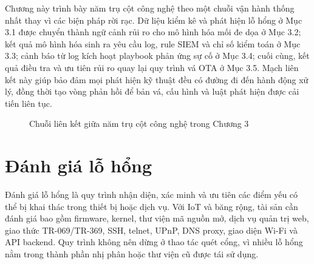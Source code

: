 \documentclass[../DoAn.tex]{subfiles}
\begin{document}
Chương này trình bày năm trụ cột công nghệ theo một chuỗi vận hành thống nhất thay vì các biện pháp rời rạc. Dữ liệu kiểm kê và phát hiện lỗ hổng ở Mục 3.1 được chuyển thành ngữ cảnh rủi ro cho mô hình hóa mối đe dọa ở Mục 3.2; kết quả mô hình hóa sinh ra yêu cầu log, rule SIEM và chỉ số kiểm toán ở Mục 3.3; cảnh báo từ log kích hoạt playbook phản ứng sự cố ở Mục 3.4; cuối cùng, kết quả điều tra và ưu tiên rủi ro quay lại quy trình vá OTA ở Mục 3.5. Mạch liên kết này giúp bảo đảm mọi phát hiện kỹ thuật đều có đường đi đến hành động xử lý, đồng thời tạo vòng phản hồi để bản vá, cấu hình và luật phát hiện được cải tiến liên tục.

\begin{figure}[H]
    \centering
    \caption{Chuỗi liên kết giữa năm trụ cột công nghệ trong Chương 3}
    \label{fig:chapter3-pipeline}
\end{figure}

\section{Đánh giá lỗ hổng}
Đánh giá lỗ hổng là quy trình nhận diện, xác minh và ưu tiên các điểm yếu có thể bị khai thác trong thiết bị hoặc dịch vụ. Với IoT và băng rộng, tài sản cần đánh giá bao gồm firmware, kernel, thư viện mã nguồn mở, dịch vụ quản trị web, giao thức TR-069/TR-369, SSH, telnet, UPnP, DNS proxy, giao diện Wi-Fi và API backend. Quy trình không nên dừng ở thao tác quét cổng, vì nhiều lỗ hổng nằm trong thành phần nhị phân hoặc thư viện cũ được tái sử dụng.
\end{document}
